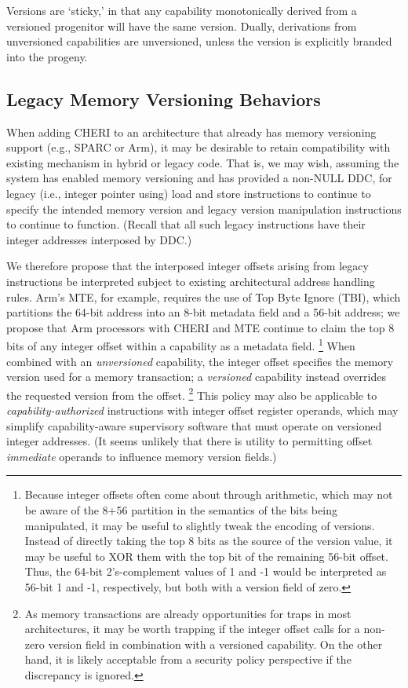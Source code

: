 Versions are `sticky,' in that any capability monotonically derived from a
versioned progenitor will have the same version.  Dually, derivations from
unversioned capabilities are unversioned, unless the version is explicitly
branded into the progeny.

\subsection{Legacy Memory Versioning Behaviors} %

When adding CHERI to an architecture that already has memory versioning support
(e.g., SPARC or Arm), it may be desirable to retain compatibility with existing
mechanism in hybrid or legacy code.  That is, we may wish, assuming the system
has enabled memory versioning and has provided a non-NULL DDC, for legacy
(i.e., integer pointer using) load and store instructions to continue to
specify the intended memory version and legacy version manipulation
instructions to continue to function.  (Recall that all such legacy
instructions have their integer addresses interposed by DDC.)

We therefore propose that the interposed integer offsets arising from legacy
instructions be interpreted subject to existing architectural address handling
rules.  Arm's MTE, for example, requires the use of Top Byte Ignore (TBI),
which partitions the 64-bit address into an 8-bit metadata field and a 56-bit
address; we propose that Arm processors with CHERI and MTE continue to claim
the top 8 bits of any integer offset within a capability as a metadata field.%
%
\footnote{Because integer offsets often come about through arithmetic, which
may not be aware of the 8+56 partition in the semantics of the bits being
manipulated, it may be useful to slightly tweak the encoding of versions.
Instead of directly taking the top 8 bits as the source of the version value,
it may be useful to XOR them with the top bit of the remaining 56-bit offset.
Thus, the 64-bit 2's-complement values of 1 and -1 would be interpreted as
56-bit 1 and -1, respectively, but both with a version field of zero.}
%
When combined with an \emph{unversioned} capability, the integer offset
specifies the memory version used for a memory transaction; a \emph{versioned}
capability instead overrides the requested version from the offset.%
%
\footnote{As memory transactions are already opportunities for traps in most
architectures, it may be worth trapping if the integer offset calls for a
non-zero version field in combination with a versioned capability.  On the
other hand, it is likely acceptable from a security policy perspective if the
discrepancy is ignored.}
%
This policy may also be applicable to \emph{capability-authorized} instructions
with integer offset register operands, which may simplify capability-aware
supervisory software that must operate on versioned integer addresses.  (It
seems unlikely that there is utility to permitting offset \emph{immediate}
operands to influence memory version fields.)

